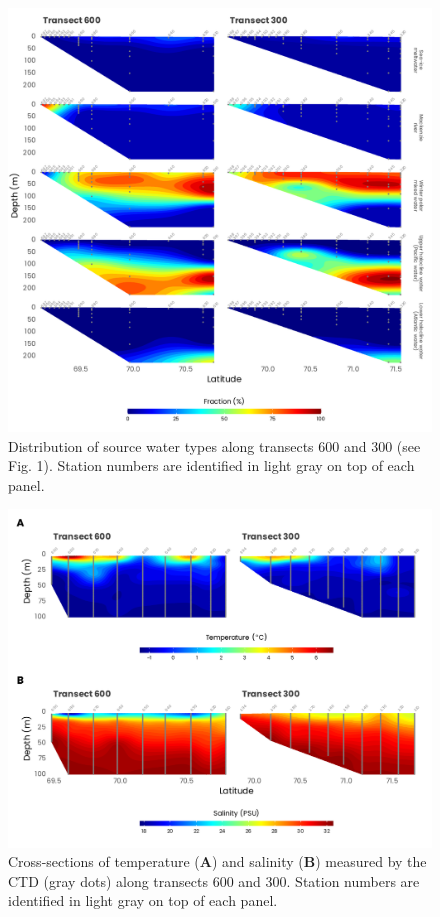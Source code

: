 \documentclass[essd, manuscript]{copernicus}
\begin{document}
\begin{figure}[H]
    \centering
    \includegraphics[scale = 1]{../../../graphs/fig04.pdf}
    \caption{Distribution of source water types along transects 600 and 300 (see Fig. 1). Station numbers are identified in light gray on top of each panel.}
\end{figure}

\clearpage

\begin{figure}[H]
    \centering
    \includegraphics[scale = 1]{../../../graphs/fig05.pdf}
    \caption{Cross-sections of temperature (\textbf{A}) and salinity (\textbf{B}) measured by the CTD (gray dots) along transects 600 and 300. Station numbers are identified in light gray on top of each panel.}
\end{figure}
\end{document}
